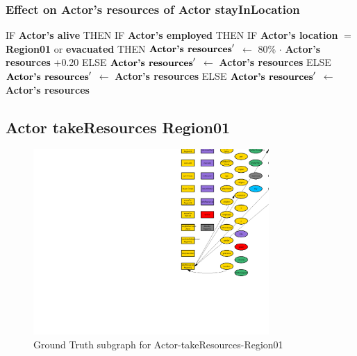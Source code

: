 \documentclass{article}%
\begin{document}
%
\subsubsection{Effect on Actor's resources of Actor stayInLocation}%
\label{ssubsec:Effect on Actor's resources of Actor stayInLocation}%
\begin{flushleft}%
IF %
\textbf{Actor's alive}%
\linebreak%
\hspace*{2em}%
THEN %
IF %
\textbf{Actor's employed}%
\linebreak%
\hspace*{4em}%
THEN %
IF %
\textbf{Actor's location}%
$=$%
\textbf{Region01}%
 or %
\textbf{evacuated}%
\linebreak%
\hspace*{6em}%
THEN %
$\mbox{\textbf{Actor's resources}} '$%
$\leftarrow$%
80\%%
$\cdot$%
\textbf{Actor's resources}%
+0.20%
\linebreak%
\hspace*{6em}%
ELSE %
$\mbox{\textbf{Actor's resources}} '$%
$\leftarrow$%
\textbf{Actor's resources}%
\linebreak%
\hspace*{4em}%
ELSE %
$\mbox{\textbf{Actor's resources}} '$%
$\leftarrow$%
\textbf{Actor's resources}%
\linebreak%
\hspace*{2em}%
ELSE %
$\mbox{\textbf{Actor's resources}} '$%
$\leftarrow$%
\textbf{Actor's resources}%
\end{flushleft}

%
\subsection{Actor takeResources Region01}%
\label{subsec:Actor takeResources Region01}%


\begin{figure}[ht]%
\centering%
\includegraphics[width=0.8\textwidth]{images/Actor-takeResources-Region01.png}%
\caption{Ground Truth subgraph for Actor{-}takeResources{-}Region01}%
\end{figure}
\end{document}
